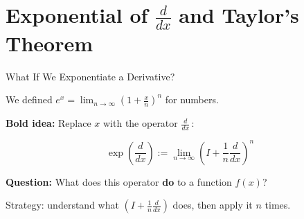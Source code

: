 \documentclass[10pt]{beamer}
\theoremstyle{definition}
\newcommand{\x}[1]{\alert{\textbf{#1}}}
\begin{document}
\section{Exponential of $\frac{d}{dx}$ and Taylor's Theorem}


\begin{frame}{What If We Exponentiate a Derivative?}

We defined $e^x = \lim_{n\to\infty}\left(1+\frac{x}{n}\right)^n$ for numbers.

\vfill

\textbf{Bold idea:} Replace $x$ with the operator $\frac{d}{dx}$\,:

$$\exp\!\left(\frac{d}{dx}\right) := \lim_{n\to\infty}\left(I + \frac{1}{n}\frac{d}{dx}\right)^n$$

\vfill\pause

\textbf{Question:} What does this operator \x{do} to a function $f(x)$?

\vfill

Strategy: understand what $\left(I + \frac{1}{n}\frac{d}{dx}\right)$ does, then apply it $n$ times.

\end{frame}
\end{document}
